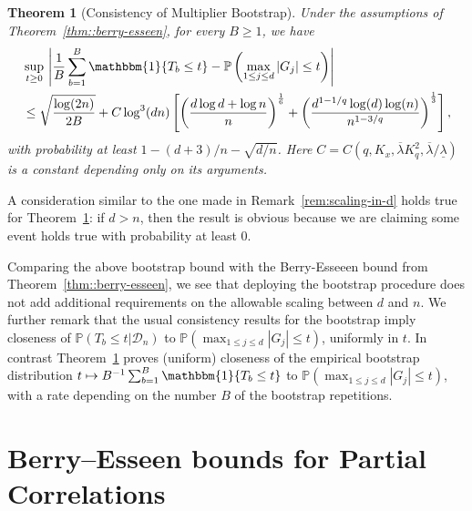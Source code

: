 \documentclass[11pt]{article}
\newtheorem{theorem}{Theorem}
\begin{document}
\begin{theorem}[Consistency of Multiplier Bootstrap]\label{thm:multiplier-bootstrap-consistency}
Under the assumptions of Theorem~\ref{thm::berry-esseen}, for every $B \ge 1$, we have
\begin{align*}
&\sup_{t\ge0}\,\left|\frac{1}{B}\sum_{b=1}^B \mathbbm{1}\{T_b \le t\} - \mathbb{P}\left(\max_{1\le j\le d}|G_j| \le t\right)\right|\\ 
&\le \sqrt{\frac{\log(2n)}{2B}} + C\log^3(dn)\left[\left(\frac{d\log d + \log n}{n}\right)^{\frac{1}{6}}
+ \left(\frac{d^{1-1/q}\log(d)\log(n)}{n^{1-3/q}}\right)^{\frac{1}{3}}\right],
\end{align*}
with probability at least $1 - (d+3)/n - \sqrt{d/n}$. Here $C = C(q, K_x, \overline{\lambda}K_q^2, \overline{\lambda}/\underline{\lambda})$ is a constant depending only on its arguments. 
\end{theorem}

A consideration similar to the one made in Remark~\ref{rem:scaling-in-d} holds true for Theorem~\ref{thm:multiplier-bootstrap-consistency}: if  $d>n$, then the result is obvious because we are claiming some event holds true with probability at least 0.

Comparing the above bootstrap bound with the Berry-Esseeen bound from Theorem~\ref{thm::berry-esseen}, we see that deploying the bootstrap procedure does not add additional requirements on the allowable scaling between $d$ and $n$.
We further remark that the usual consistency results for the bootstrap imply closeness of $\mathbb{P}(T_b \le t\big|\mathcal{D}_n)$ to $\mathbb{P}(\max_{1\le j\le d}|G_j| \le t)$, uniformly in $t$. In contrast Theorem~\ref{thm:multiplier-bootstrap-consistency} proves (uniform) closeness of the empirical bootstrap distribution $t\mapsto B^{-1}\sum_{b=1}^B \mathbbm{1}\{T_b \le t\}$ to $\mathbb{P}(\max_{1\le j\le d}|G_j| \le t)$, with a rate depending on the number $B$ of the bootstrap repetitions.


\section{Berry--Esseen bounds for Partial Correlations}
\label{section::partial}
\end{document}
